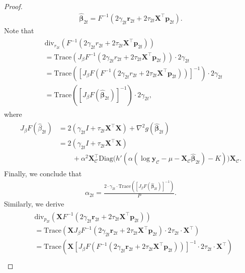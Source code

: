 \begin{proof}
    \begin{align}
        \hat{\bm{\beta}}_{2t} = F^{-1}(2 \gamma_{2t} \bm{r}_{2t} + 2 \tau_{2t} \bm{X}^\top \bm{p}_{2t}).
    \end{align}
    Note that
    \begin{align}
        \begin{split}
        & \text{div}_{r_{2t}}( F^{-1}(2 \gamma_{2t} r_{2t} + 2 \tau_{2t} \bm{X}^\top \bm{p}_{2t}) ) \\
        & = \text{Trace}(J_{\beta}F^{-1}(2 \gamma_{2t} r_{2t} + 2 \tau_{2t} \bm{X}^\top \bm{p}_{2t})) \cdot 2 \gamma_{2t} \\
        & = \text{Trace}([J_{\beta}F(F^{-1}(2 \gamma_{2t} r_{2t} + 2 \tau_{2t} \bm{X}^\top \bm{p}_{2t}))]^{-1}) \cdot 2 \gamma_{2t} \\
        & = \text{Trace}([J_{\beta}F(\hat{\bm{\beta}}_{2t})]^{-1}) \cdot 2 \gamma_{2t},
        \end{split}
    \end{align}
    where 
    \begin{align}
        \begin{split}
        J_{\beta} F(\hat{\beta}_{2t}) & = 2(\gamma_{2t}I + \tau_{2t}\bm{X}^\top\bm{X}) + \nabla^2 g(\hat{\bm{\beta}}_{2t}) \\
        & = 2(\gamma_{2t}I + \tau_{2t}\bm{X}^\top\bm{X}) \\
        & \qquad + \alpha^2 \bm{X}_\mathcal{C}^\top \text{Diag}\big(h'(\alpha(\log \bm{y}_\mathcal{C} - \mu - \bm{X}_\mathcal{C} \hat{\bm{\beta}}_{2t})-K)\big) \bm{X}_\mathcal{C}.
        \end{split}
    \end{align}
    Finally, we conclude that %
    \begin{align}
        \alpha_{2t} = \frac{2 \cdot \gamma_{2t} \cdot \text{Trace}([J_{\beta}F(\hat{\bm{\beta}}_{2t})]^{-1})}{P}.
    \end{align}
    Similarly, we derive %
    \begin{align}
        \begin{split}
        & \text{div}_{p_{2t}}(\bm{X} F^{-1}(2 \gamma_{2t} \bm{r}_{2t} + 2 \tau_{2t} \bm{X}^\top \bm{p}_{2t}) ) \\
        & = \text{Trace}(\bm{X} J_{\beta}F^{-1}(2 \gamma_{2t} \bm{r}_{2t} + 2 \tau_{2t} \bm{X}^\top \bm{p}_{2t}) \cdot 2 \tau_{2t} \cdot \bm{X}^\top) \\
        & = \text{Trace}(\bm{X} [J_{\beta}F(F^{-1}(2 \gamma_{2t} \bm{r}_{2t} + 2 \tau_{2t} \bm{X}^\top \bm{p}_{2t}))]^{-1} \cdot 2 \tau_{2t} \cdot \bm{X}^\top) \\

\end{split}
\end{align}
\end{proof}
